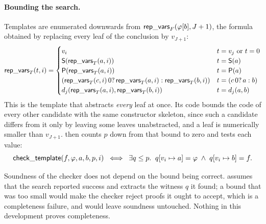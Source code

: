 \paragraph{Bounding the search.}
Templates are enumerated downwards from
$\mathsf{rep\_vars}_F(\varphi[b], J+1)$, the formula obtained by replacing every
leaf of the conclusion by $v_{J+1}$:
\[
\mathsf{rep\_vars}_T(t, i) =
\begin{cases}
v_i                                        & t = v_j \text{ or } t = 0\\
\mathsf{S}(\mathsf{rep\_vars}_T(a, i))               & t = \mathsf{S}(a)\\
\mathsf{P}(\mathsf{rep\_vars}_T(a, i))               & t = \mathsf{P}(a)\\
(\mathsf{rep\_vars}_T(c, i)\,0?\,\mathsf{rep\_vars}_T(a, i) : \mathsf{rep\_vars}_T(b, i))
                                           & t = (c\,0?\,a:b)\\
d_j(\mathsf{rep\_vars}_T(a, i), \mathsf{rep\_vars}_T(b, i))
                                           & t = d_j(a, b)
\end{cases}
\]
This is the template that abstracts \emph{every} leaf at once.  Its code
bounds the code of every other candidate with the same constructor skeleton,
since such a candidate differs from it only by leaving some leaves
unabstracted, and a leaf is numerically smaller than $v_{J+1}$.
 then counts $p$ down from that bound to zero and tests
each value:
\[
\mathsf{check\_template}(f, \varphi, a, b, p, i) \;\;\Longleftrightarrow\;\;
\exists q \leq p.\;\; q[v_i \mapsto a] = \varphi \;\wedge\; q[v_i \mapsto b] = f.
\]


\begin{remarkx}
Soundness of the checker does not depend on the bound being correct.
 assumes that the search reported success and
extracts the witness $q$ it found; a bound that was too small would make the
checker reject proofs it ought to accept, which is a completeness failure, and
would leave soundness untouched.  Nothing in this development proves
completeness.
\end{remarkx}

